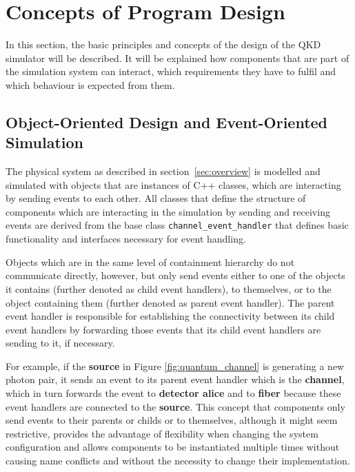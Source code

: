 \section{Concepts of Program Design}
\label{sec:concepts}

In this section, the basic principles and concepts of the design of the QKD simulator will be described. It will be explained how components that are part of the simulation system can interact, which requirements they have to fulfil and which behaviour is expected from them. 

\subsection{Object-Oriented Design and Event-Oriented Simulation}

The physical system as described in section~\ref{sec:overview} is modelled and simulated with objects that are instances of C++ classes, which are interacting by sending events to each other. All classes that define the structure of components which are interacting in the simulation by sending and receiving events are derived from the base class \texttt{channel\_event\_handler} that defines basic functionality and interfaces necessary for event handling. 

Objects which are in the same level of containment hierarchy do not communicate directly, however, but only send events either to one of the objects it contains (further denoted as child event handlers), to themselves, or to the object containing them (further denoted as parent event handler). The parent event handler is responsible for establishing the connectivity between its child event handlers by forwarding those events that its child event handlers are sending to it, if necessary. 

For example, if the \textbf{source} in Figure \ref{fig:quantum_channel} is generating a new photon pair, it sends an event to its parent event handler which is the \textbf{channel}, which in turn forwards the event to \textbf{detector alice} and to \textbf{fiber} because these event handlers are connected to the \textbf{source}. This concept that components only send events to their parents or childs or to themselves, although it might seem restrictive, provides the advantage of flexibility when changing the system configuration and allows components to be instantiated multiple times without causing name conflicts and without the necessity to change their implementation.

